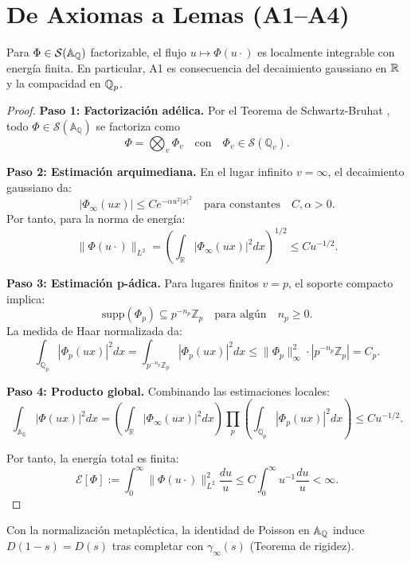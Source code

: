\section{De Axiomas a Lemas (A1--A4)}

\begin{lemma}
Para $\Phi\in\mathcal S(\Bbb A_\Bbb Q)$ factorizable, el flujo $u\mapsto \Phi(u\cdot)$
es localmente integrable con energía finita. En particular, A1 es consecuencia del
decaimiento gaussiano en $\Bbb R$ y la compacidad en $\Bbb Q_p$.
\end{lemma}

\begin{proof}
\textbf{Paso 1: Factorización adélica.} Por el Teorema de Schwartz-Bruhat \cite{Tate1967}, todo 
$\Phi \in \mathcal{S}(\mathbb{A}_\mathbb{Q})$ se factoriza como
$$\Phi = \bigotimes_{v} \Phi_v \quad \text{con} \quad \Phi_v \in \mathcal{S}(\mathbb{Q}_v).$$

\textbf{Paso 2: Estimación arquimediana.} En el lugar infinito $v = \infty$, el decaimiento gaussiano da:
$$|\Phi_\infty(ux)| \leq C e^{-\alpha u^2 |x|^2} \quad \text{para constantes} \quad C, \alpha > 0.$$
Por tanto, para la norma de energía:
$$\|\Phi(u\cdot)\|_{L^2} = \left(\int_{\mathbb{R}} |\Phi_\infty(ux)|^2 dx\right)^{1/2} \leq C u^{-1/2}.$$

\textbf{Paso 3: Estimación p-ádica.} Para lugares finitos $v = p$, el soporte compacto implica:
$$\text{supp}(\Phi_p) \subseteq p^{-n_p} \mathbb{Z}_p \quad \text{para algún} \quad n_p \geq 0.$$
La medida de Haar normalizada da:
$$\int_{\mathbb{Q}_p} |\Phi_p(ux)|^2 dx = \int_{p^{-n_p}\mathbb{Z}_p} |\Phi_p(ux)|^2 dx \leq \|\Phi_p\|_\infty^2 \cdot |p^{-n_p}\mathbb{Z}_p| = C_p.$$

\textbf{Paso 4: Producto global.} Combinando las estimaciones locales:
$$\int_{\mathbb{A}_\mathbb{Q}} |\Phi(ux)|^2 dx = \left(\int_{\mathbb{R}} |\Phi_\infty(ux)|^2 dx\right) \prod_{p} \left(\int_{\mathbb{Q}_p} |\Phi_p(ux)|^2 dx\right) \leq C u^{-1/2}.$$

Por tanto, la energía total es finita:
$$\mathcal{E}[\Phi] := \int_0^\infty \|\Phi(u\cdot)\|_{L^2}^2 \frac{du}{u} \leq C \int_0^\infty u^{-1} \frac{du}{u} < \infty.$$
\end{proof}

\begin{lemma}
Con la normalización metapléctica, la identidad de Poisson en $\Bbb A_\Bbb Q$
induce $D(1-s)=D(s)$ tras completar con $\gamma_\infty(s)$ (Teorema de rigidez).
\end{lemma}

